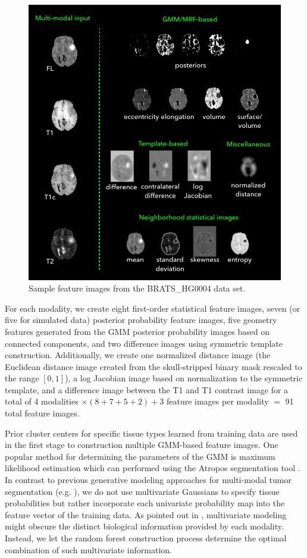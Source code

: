 \documentclass{llncs}
\begin{document}
\begin{figure}
  \centerline{
  \includegraphics[width=125mm]{Figures/featuresImages2.pdf}
  }
  \caption{Sample feature images from the BRATS\_HG0004 data set.}
  \label{fig:featureImages}
\end{figure}

For each modality, we create eight first-order statistical feature images,
seven (or five for simulated data) posterior probability feature images, five geometry features generated from the GMM posterior probability images
based on connected components, and two difference images using symmetric template
construction.  Additionally, we create one normalized distance image 
(the Euclidean distance image \cite{maurer2003} created from the skull-stripped 
binary mask rescaled to the range $[0,1]$), a log Jacobian image based on normalization to the symmetric template, and a difference image between the T1 and T1 contrast image for a total of 4 modalities $\times (8 + 7 + 5 + 2) + 3$ feature images per modality $=$ 91 total
feature images.  

Prior  cluster centers for specific tissue types learned from training data \cite{reynolds2009} are used in the first stage to construction multiple 
GMM-based feature images.  One popular method for 
determining the parameters of the GMM is maximum likelihood 
estimation which can performed using the Atropos segmentation 
tool \cite{avants2011}.  In contrast to previous generative
modeling approaches for multi-modal tumor segmentation 
(e.g. \cite{prastawa2003,zikic2012}), we do not use multivariate 
Gaussians to specify tissue probabilities but rather incorporate each
univariate probability map into the feature vector of the training
data.  As pointed out in \cite{menze2010}, multivariate modeling
might obscure the distinct biological information provided by each 
modality.  Instead, we let the random forest construction 
process determine the optimal combination of such multivariate
information.  
\end{document}
